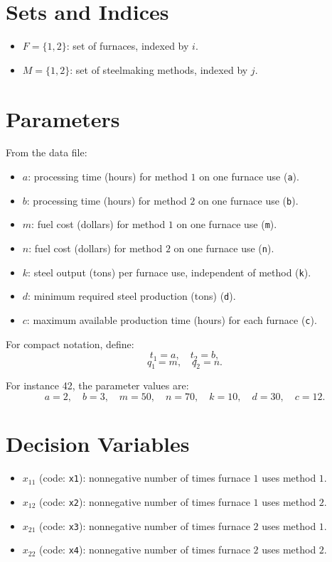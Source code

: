 \section*{Sets and Indices}

\begin{itemize}
    \item $F = \{1,2\}$: set of furnaces, indexed by $i$.
    \item $M = \{1,2\}$: set of steelmaking methods, indexed by $j$.
\end{itemize}

\section*{Parameters}

From the data file:

\begin{itemize}
    \item $a$: processing time (hours) for method $1$ on one furnace use (\texttt{a}).
    \item $b$: processing time (hours) for method $2$ on one furnace use (\texttt{b}).
    \item $m$: fuel cost (dollars) for method $1$ on one furnace use (\texttt{m}).
    \item $n$: fuel cost (dollars) for method $2$ on one furnace use (\texttt{n}).
    \item $k$: steel output (tons) per furnace use, independent of method (\texttt{k}).
    \item $d$: minimum required steel production (tons) (\texttt{d}).
    \item $c$: maximum available production time (hours) for each furnace (\texttt{c}).
\end{itemize}

For compact notation, define:
\[
t_1 = a,\quad t_2 = b,
\]
\[
q_1 = m,\quad q_2 = n.
\]

For instance 42, the parameter values are:
\[
a=2,\quad b=3,\quad m=50,\quad n=70,\quad k=10,\quad d=30,\quad c=12.
\]

\section*{Decision Variables}

\begin{itemize}
    \item $x_{11}$ (code: \texttt{x1}): nonnegative number of times furnace $1$ uses method $1$.
    \item $x_{12}$ (code: \texttt{x2}): nonnegative number of times furnace $1$ uses method $2$.
    \item $x_{21}$ (code: \texttt{x3}): nonnegative number of times furnace $2$ uses method $1$.
    \item $x_{22}$ (code: \texttt{x4}): nonnegative number of times furnace $2$ uses method $2$.
\end{itemize}

